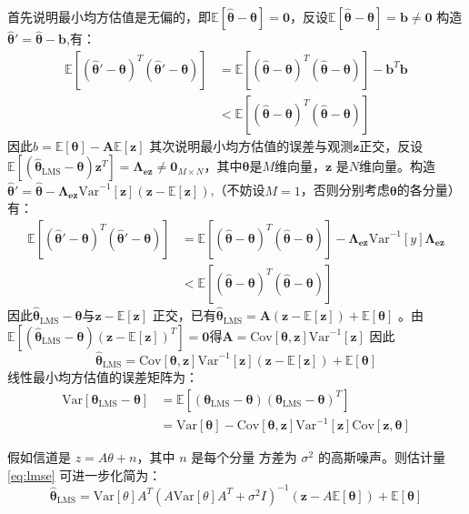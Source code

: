 \documentclass{article}
\def\E{\mathbb{E}}
\def\Var{\textrm{Var}}
\def\Cov{\textrm{Cov}}
\begin{document}
\begin{enumerate}
首先说明最小均方估值是无偏的，即$\E[\hat{\bm{\theta}}-\bm{\theta}]=\bm{0}$，反设$ \E[\hat{\bm{\theta}}-\bm{\theta}]=\bm{b}\neq \bm{0}$
构造$\hat{\bm{\theta}}'=\hat{\bm{\theta}}-\bm{b}$,有：
\begin{align*}
\E[(\hat{\bm{\theta}}'-\bm{\theta})^T(\hat{\bm{\theta}}'-\bm{\theta})] & = \E[(\hat{\bm{\theta}}-\bm{\theta})^T(\hat{\bm{\theta}}-\bm{\theta})]-\bm{b}^T\bm{b}\\
& < \E[(\hat{\bm{\theta}}-\bm{\theta})^T(\hat{\bm{\theta}}-\bm{\theta})]
\end{align*}
因此$b=\E[\bm{\theta}]-\bm{A}\E[\bm{z}]$
其次说明最小均方估值的误差与观测$\bm{z}$正交，反设$\E[(\hat{\bm{\theta}}_{\textrm{LMS}}-\bm{\theta})\bm{z}^T]=\bm{\Lambda_{ez}}\neq \bm{0}_{M\times N}$，其中$\bm{\theta}$是$M$维向量，$\bm{z}$ 是$N$维向量。构造$\hat{\bm{\theta}}'=\hat{\bm{\theta}}-\bm{\Lambda_{ez}}\Var^{-1}[\bm{z}](\bm{z}-\E[\bm{z}])$,（不妨设$M=1$，否则分别考虑$\bm{\theta}$的各分量）有：
\begin{align*}
\E[(\hat{\bm{\theta}}'-\bm{\theta})^T(\hat{\bm{\theta}}'-\bm{\theta})] & = \E[(\hat{\bm{\theta}}-\bm{\theta})^T(\hat{\bm{\theta}}-\bm{\theta})]-\bm{\Lambda_{ez}}\Var^{-1}[y]\bm{\Lambda_{ez}}\\
& < \E[(\hat{\bm{\theta}}-\bm{\theta})^T(\hat{\bm{\theta}}-\bm{\theta})]
\end{align*}
因此$\hat{\bm{\theta}}_{\textrm{LMS}}-\bm{\theta}$与$\bm{z}-\E[\bm{z}]$ 正交，已有$\hat{\bm{\theta}}_{\textrm{LMS}}=\bm{A}(\bm{z}-\E[\bm{z}])+\E[\bm{\theta}]$
。由$\E[(\hat{\bm{\theta}}_{\textrm{LMS}}-\bm{\theta})(\bm{z}-\E[\bm{z}])^T]=\bm{0}$得$\bm{A}=\Cov[\bm{\theta},\bm{z}]\Var^{-1}[\bm{z}]$
因此
\begin{equation}\label{eq:lmse}
\hat{\bm{\theta}}_{\textrm{LMS}}=\Cov[\bm{\theta},\bm{z}]\Var^{-1}[\bm{z}](\bm{z}-\E[\bm{z}])+\E[\bm{\theta}]
\end{equation}
线性最小均方估值的误差矩阵为：
\begin{align*}
\Var[\bm{\theta}_{\textrm{LMS}}-\bm{\theta}] & = \E[(\bm{\theta}_{\textrm{LMS}}-\bm{\theta})(\bm{\theta}_{\textrm{LMS}}-\bm{\theta})^T] \\
& = \Var[\bm{\theta}] - \Cov[\bm{\theta},\bm{z}]\Var^{-1}[\bm{z}]\Cov[\bm{z},\bm{\theta}]
\end{align*}

假如信道是 $z = A \theta + n$，其中 $n$ 是每个分量
方差为 $\sigma^2$ 的高斯噪声。则估计量 \eqref{eq:lmse}
可进一步化简为：
\begin{equation}
    \hat{\bm{\theta}}_{\textrm{LMS}}=
    \Var[\theta]A^T
    (A \Var[\theta]A^T + \sigma^2 I)^{-1}
    (\bm{z}-A \E[\bm{\theta}])+\E[\bm{\theta}]
\end{equation}


\end{enumerate}
\end{document}
